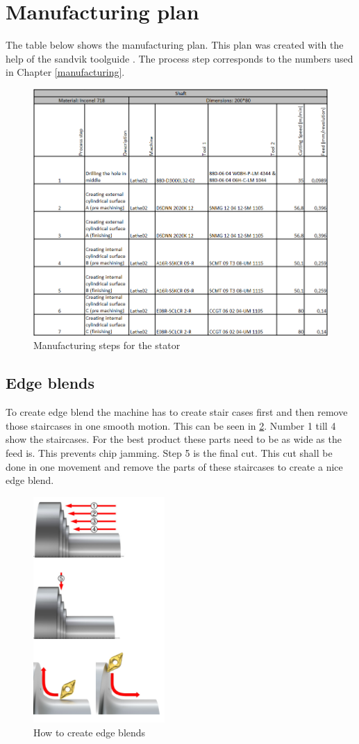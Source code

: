 \clearpage
\section{Manufacturing plan}
\label{appendixmanufacturing}
The table below shows the manufacturing plan. This plan was created with the help of the sandvik toolguide \cite{Sandvik}. The process step corresponds to the numbers used in Chapter \ref{manufacturing}. 
\begin{figure}[H]
\centering
\includegraphics[width=12cm]{Figures/manufacturingtablefinal.PNG}
\caption{Manufacturing steps for the stator}
\label{manutable}
\end{figure}


\clearpage
\subsection*{Edge blends}
To create edge blend the machine has to create stair cases first and then remove those staircases in one smooth motion. This can be seen in \ref{edgeblend}. Number 1 till 4 show the staircases. For the best product these parts need to be as wide as the feed is. This prevents chip jamming. Step 5 is the final cut. This cut shall be done in one movement and remove the parts of these staircases to create a nice edge blend.

\begin{figure}[H]
\centering
\includegraphics[width=5cm]{Figures/slanted.png}
\caption{How to create edge blends}
\label{edgeblend}
\end{figure}
\newpage